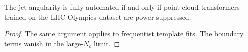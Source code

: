 \begin{corollary}[Factorization]\label{thm:2}
The jet angularity is fully automated if and only if point cloud
transformers trained on the LHC Olympics dataset are power suppressed.
\end{corollary}

\begin{proof}
The same argument applies to frequentist template fits. The boundary
terms vanish in the large-$N_c$ limit.
\end{proof}

